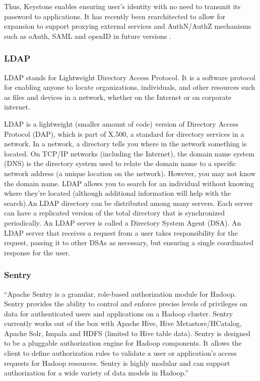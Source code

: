 {     Thus, Keystone enables ensuring user’s identity with no need to
     transmit its password to applications. It has recently been
     rearchitected to allow for expansion to support proxying external
     services and AuthN/AuthZ mechanisms such as oAuth, SAML and
     openID in future versions \cite{www-keystone}.

\subsubsection{LDAP}

     LDAP stands for Lightweight Directory Access Protocol. It is a software
     protocol for enabling anyone to locate organizations, individuals, and
     other resources such as files and devices in a network, whether on the
     Internet or on corporate internet.
     \cite{www-ldap}

     LDAP is a lightweight (smaller amount of code) version of
     Directory Access Protocol (DAP), which is part of X.500, a
     standard for directory services in a network.  In a network, a
     directory tells you where in the network something is located. On
     TCP/IP networks (including the Internet), the domain name system
     (DNS) is the directory system used to relate the domain name to a
     specific network address (a unique location on the
     network). However, you may not know the domain name. LDAP allows
     you to search for an individual without knowing where they're
     located (although additional information will help with the
     search).An LDAP directory can be distributed among many
     servers. Each server can have a replicated version of the total
     directory that is synchronized periodically.  An LDAP server is
     called a Directory System Agent (DSA). An LDAP server that
     receives a request from a user takes responsibility for the
     request, passing it to other DSAs as necessary, but ensuring a
     single coordinated response for the user.

\subsubsection{Sentry \cv}

     ``Apache Sentry \cite{www-sentry}  is a granular, role-based authorization 
     module for Hadoop. Sentry provides the ability to control and enforce 
     precise levels of privileges on data for authenticated users and 
     applications on a Hadoop cluster. Sentry currently works out of the box 
     with Apache Hive, Hive Metastore/HCatalog, Apache Solr, Impala and HDFS 
     (limited to Hive table data). Sentry is designed to be a pluggable 
     authorization engine for Hadoop components. It allows the client to define 
     authorization rules to validate a user or application’s access requests 
     for Hadoop resources. Sentry is highly modular and can support authorization 
     for a wide variety of data models in Hadoop.''

}

